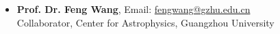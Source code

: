 \documentclass[letterpaper,10pt]{article}
\begin{document}
\begin{CJK}{UTF8}{gbsn}
\begin{itemize}
    \item \textbf{Prof. Dr. Feng Wang}, Email: \href{mailto:{fengwang@gzhu.edu.cn}}{fengwang@gzhu.edu.cn} \\
    Collaborator, Center for Astrophysics, Guangzhou University \\
    
\end{itemize}












\end{CJK}
\end{document}

